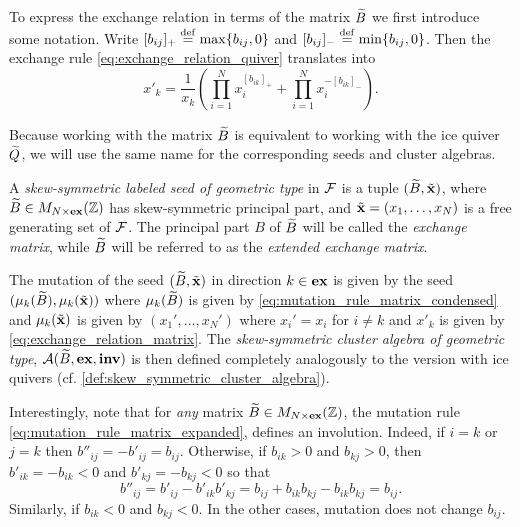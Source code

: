 To express the exchange relation in terms of the matrix $\widetilde{B}$ we first introduce some
notation. Write $[b_{ij}]_{+} \overset{\mathrm{def}}{=} \max\{b_{ij}, 0\}$ and $[b_{ij}]_{-} \overset{\mathrm{def}}{=}
	\min\{b_{ij}, 0\}$. Then the exchange rule \cref{eq:exchange_relation_quiver}
translates into
\begin{equation}\label{eq:exchange_relation_matrix}
	x'_k = \frac{1}{x_k}\left(\prod_{i=1}^N x_i^{[b_{ik}]_{+}} + \prod_{i=1}^{N} x_i^{-[b_{ik}]_{-}}\right).
\end{equation}

Because working with the matrix $\widetilde{B}$ is equivalent to working with the ice quiver
$\widetilde{Q}$, we will use the same name for the corresponding seeds and cluster algebras.
\begin{definition}

	A \emph{skew-symmetric labeled seed of geometric type} in $\mathcal{F}$ is a tuple $(\widetilde{B}, \tilde{\mathbf{x}})$, where $\widetilde{B} \in M_{N \times
				\mathbf{ex}}(\mathbb{Z})$ has skew-symmetric principal part, and $\tilde{\mathbf{x}} = (x_1, \dots, x_N)$ is a free
	generating set of $\mathcal{F}$. The principal part $B$ of $\widetilde{B}$ will be called the
	\emph{exchange matrix}, while $\widetilde{B}$ will be referred to as the
	\emph{extended exchange matrix}.

	The mutation of the seed $(\widetilde{B}, \tilde{\mathbf{x}})$ in direction $k \in \mathbf{ex}$ is given by the seed
	$(\mu_k(\widetilde{B}), \mu_k(\tilde{\mathbf{x}}))$ where $\mu_k(\widetilde{B})$ is given by
	\cref{eq:mutation_rule_matrix_condensed} and $\mu_k(\tilde{\mathbf{x}})$ is given by $(x_1', \dots,
		x_N')$ where $x_i' = x_i$ for $i\neq k$ and $x'_k$ is given by
	\cref{eq:exchange_relation_matrix}. The \emph{skew-symmetric cluster algebra of
		geometric type}, $\mathcal{A}(\widetilde{B},
		\mathbf{ex}, \mathbf{inv})$ is then defined completely
	analogously to the version with ice quivers (cf.
	\cref{def:skew_symmetric_cluster_algebra}).
\end{definition}

Interestingly, note that for \emph{any} matrix $\widetilde{B} \in M_{N\times \mathbf{ex}}(\mathbb{Z})$, the
mutation rule \cref{eq:mutation_rule_matrix_expanded}, defines an involution. Indeed,
if $i = k$ or $j = k$ then $b''_{ij} = -b'_{ij} = b_{ij}$. Otherwise, if $b_{ik} > 0$
and $b_{kj} >0$, then $b'_{ik} = -b_{ik} < 0$ and $b'_{kj} = -b_{kj} < 0$ so that
\begin{equation*}
	b''_{ij} = b'_{ij} - b'_{ik}b'_{kj} = b_{ij} + b_{ik}b_{kj} - b_{ik}b_{kj} = b_{ij}.
\end{equation*}
%
Similarly, if $b_{ik} < 0$ and $b_{kj} < 0$. In the other cases, mutation does not
change $b_{ij}$.

